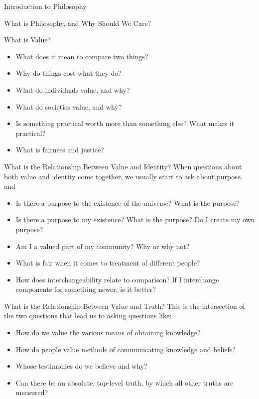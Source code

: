 \begin{chapter}{Introduction to Philosophy}
\begin{section}{What is Philosophy, and Why Should We Care?}
\begin{subsection}{What is Value?}
            \begin{itemize}
                \item What does it mean to compare two things?
                \item Why do things cost what they do?
                \item What do individuals value, and why?
                \item What do societies value, and why?
                \item Is something practical worth more than something else? What makes it practical?
                \item What is fairness and justice?
            \end{itemize}
        \end{subsection}
        \begin{subsection}{What is the Relationship Between Value and Identity?}
            When questions about both value and identity come together, we usually start to ask about purpose, and
            \begin{itemize}
                \item Is there a purpose to the existence of the universe? What is the purpose?
                \item Is there a purpose to my existence? What is the purpose? Do I create my own purpose?
                \item Am I a valued part of my community? Why or why not?
                \item What is fair when it comes to treatment of different people?
                \item How does interchangeability relate to comparison? If I interchange components for something newer, is it better?
            \end{itemize}
        \end{subsection}
        \begin{subsection}{What is the Relationship Between Value and Truth?}
            This is the intersection of the two questions that lead us to asking questions like:
            \begin{itemize}
                \item How do we value the various means of obtaining knowledge?
                \item How do people value methods of communicating knowledge and beliefs?
                \item Whose testimonies do we believe and why?
                \item Can there be an absolute, top-level truth, by which all other truths are measured?

\end{itemize}
\end{subsection}
\end{section}
\end{chapter}
